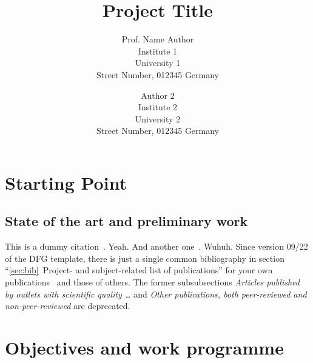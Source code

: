 \documentclass[american,firsttime]{dfgproposal}
\title{Project Title}
\author[%
	Prof. Name Author\\
	Institute 1, University 1 (Abbr)
	\and
	Author 2\\
	Institute 2, University 2 (Abbr2)
]{Prof. Name Author\\
	Institute 1\\University 1\\Street Number, 012345 Germany
	\and
	Author 2\\
	Institute 2\\University 2\\Street Number, 012345 Germany
}
\newcommand{\note}[1]{{\color{orange}{#1}}}
\begin{document}
	\maketitle
	
	\note{Sections 1--3 must not exceed 17 pages in total.}
	
	\section{Starting Point}
	\label{sec:work-report}
	
	\subsection*{State of the art and preliminary work}
	This is a dummy citation~\cite{Hoelzer:17}. Yeah. And another
	one~\cite{Gerst:18}. Wuhuh.
	Since version 09/22 of the DFG template, there is just a single common
	bibliography in section \enquote{\ref{sec:bib}~Project- and subject-related
	list of publications} for your own publications~\cite{Hoelzer:16, Desiro:18}
	and those of others. The former subsubsections \emph{Articles published by
	outlets with scientific quality \dots} and \emph{Other publications, both
	peer-reviewed and non-peer-reviewed} are deprecated.
	
	\blindtext[1]
	
	
	\section{Objectives and work programme}
	
\end{document}
